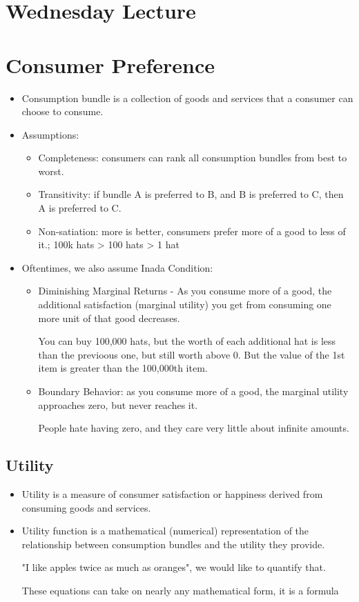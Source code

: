 \documentclass{article}
\begin{document}
\newpage

\section*{Wednesday Lecture}

\section{Consumer Preference}
\begin{itemize}
  \item Consumption bundle is a collection of goods and services
    that a consumer can choose to consume.
  \item Assumptions:
    \begin{itemize}
      \item Completeness: consumers can rank all consumption bundles
        from best to worst.
      \item Transitivity: if bundle A is preferred to B, and B is preferred to C,
        then A is preferred to C.
      \item Non-satiation: more is better, consumers prefer more of a good
        to less of it.; 100k hats > 100 hats > 1 hat
    \end{itemize}
  \item Oftentimes, we also assume Inada Condition:
    \begin{itemize}
      \item Diminishing Marginal Returns - As you consume more of a good, the additional satisfaction
        (marginal utility) you get from consuming one more unit of that good
        decreases.

        You can buy 100,000 hats, but the worth of each additional hat is less than the previoous one,
        but still worth above 0. But the value of the 1st item is greater than the 100,000th item.
      \item Boundary Behavior: as you consume more of a good,
        the marginal utility approaches zero, but never reaches it.

        People hate having zero, and they care very little about infinite amounts.
    \end{itemize}
\end{itemize}

\subsection{Utility}
\begin{itemize}
  \item Utility is a measure of consumer satisfaction or happiness
    derived from consuming goods and services.
  \item Utility function is a mathematical (numerical) representation of the relationship
    between consumption bundles and the utility they provide.

    "I like apples twice as much as oranges", we would like to quantify that.

    These equations can take on nearly any mathematical form, it is a formula
\end{itemize}
\end{document}
